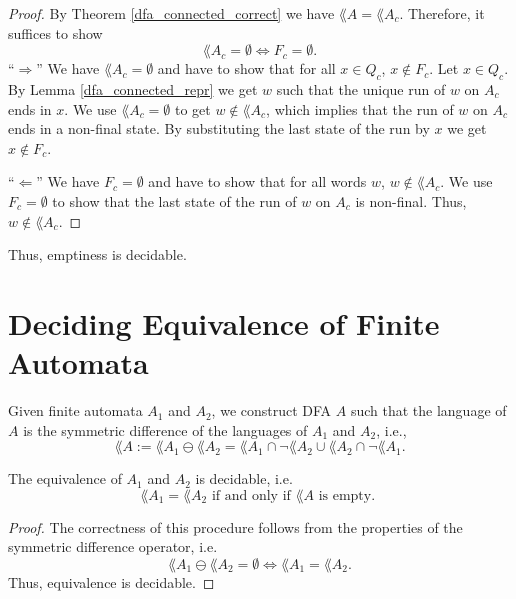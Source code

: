 \begin{proof}
    By Theorem \ref{dfa_connected_correct} we have $\lang{A} = \lang{A_c}$.
    Therefore, it suffices to show
    \begin{equation*}
        \lang{A_c} = \emptyset \iff F_c = \emptyset.
    \end{equation*}
    ``$\Rightarrow$''
    We have $\lang{A_c} = \emptyset$ and have to show that for all $x \in Q_c$, $x \notin F_c$.
    Let $x \in Q_c$. 
    By Lemma \ref{dfa_connected_repr} we get $w$ such that the unique run of $w$ on $A_c$
    ends in $x$. 
    We use $\lang{A_c} = \emptyset$ to get $w \notin \lang{A_c}$, 
    which implies that the run of $w$ on $A_c$ ends in a non-final state.
    By substituting the last state of the run by $x$ we get $x \notin F_c$.

    ``$\Leftarrow$''
    We have $F_c = \emptyset$ and have to show that for all words $w$, $w \notin \lang{A_c}$.
    We use $F_c = \emptyset$ to show that the last state of the run of $w$ on $A_c$ is non-final.
    Thus, $w \notin \lang{A_c}$.

\end{proof}

    Thus, emptiness is decidable.






\section{Deciding Equivalence of Finite Automata}
Given finite automata $A_1$ and $A_2$, we construct DFA $A$ such that the language of $A$ is the symmetric difference of the languages of $A_1$ and $A_2$, i.e.,
\begin{equation*}          
    \lang{A} := \lang{A_1} \ominus \lang{A_2} = \lang{A_1} \cap \neg \lang{A_2} \cup \lang{A_2} \cap \neg \lang{A_1}.      
\end{equation*}
\begin{theorem} The equivalence of $A_1$ and $A_2$ is decidable, i.e.
    \label{dfa_sym_diff_correct}
    \begin{equation*}                
        \lang{A_1} = \lang{A_2} \mbox{ if and only if } \lang{A} \mbox{ is empty. }                
    \end{equation*}
\end{theorem}
\begin{proof}
    The correctness of this procedure follows from the properties of the symmetric difference operator, i.e.
    \begin{equation*}                  
        \lang{A_1} \ominus \lang{A_2} = \emptyset \Leftrightarrow \lang{A_1} = \lang{A_2}.                  
    \end{equation*}
    Thus, equivalence is decidable.    
\end{proof}

